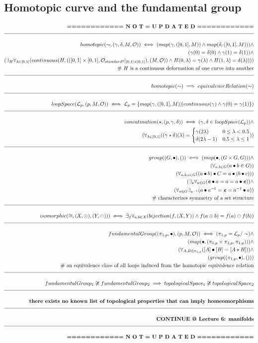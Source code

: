 \documentclass[a4paper]{article}
\newcommand{\melazy}{\textbf{============ N O T = U P D A T E D ============}}
\newcommand{\eqComment}[1]{\text{  \# #1}}
\newcommand{\n}{\\[1.5ex] \hline \nonumber \\[0ex]}
\newcommand{\m}{\nonumber \\}
\newcommand{\field}[1]{\textbf{\textit{#1}}}
\begin{document}
\subsection{Homotopic curve and the fundamental group}
\begin{tcolorbox}
\begin{align}
   \melazy
\n homotopic(\sim, (\gamma, \delta, M, \mathcal{O})) \iff (map(\gamma, ([0, 1], M)) \land map(\delta, ([0, 1], M))) \land 
\m (\gamma(0) = \delta(0) \land \gamma(1) = \delta(1)) \land
\m (\exists_H \forall_{\lambda \in [0, 1]} (continuous(H, (([0, 1] \times [0, 1], \mathcal{O}_{standard^2}|_{[0, 1] \times [0, 1]}), (M, \mathcal{O})) \land H(0, \lambda) = \gamma(\lambda) \land H(1, \lambda) = \delta(\lambda))))
\m \eqComment{$H$ is a continuous deformation of one curve into another}
\n homotopic(\sim) \implies equivalenceRelation(\sim)
\n loopSpace(\mathcal{L}_p, (p, M, \mathcal{O})) \iff \mathcal{L}_p = \{map(\gamma, ([0, 1], M))| continuous(\gamma) \land \gamma(0) = \gamma(1)\})
\n concatination(\star, (p, \gamma, \delta)) \iff (\gamma, \delta \in loopSpace(\mathcal{L}_p)) \land
\m (\forall_{\lambda \in [0, 1]} ((\gamma \star \delta) (\lambda) = \begin{cases} \gamma(2 \lambda) & 0 \leq \lambda < 0.5 \\ \delta(2 \lambda - 1) & 0.5 \leq \lambda \leq 1 \end{cases}))
\n group((G, \bullet), ()) \iff (map(\bullet, (G \times G, G))) \land
\m (\forall_{a, b \in G} (a \bullet b \in G))
\m (\forall_{a, b, c \in G} ((a \bullet b) \bullet C = a \bullet (b \bullet c)))
\m (\exists_\field{e} \forall_{a \in G} (\field{e} \bullet a = a = a \bullet \field{e})) \land
\m (\forall_{a \in G} \exists_{a^{-1}} (a \bullet a^{-1} = \field{e} = a^{-1} \bullet a))
\m \eqComment{characterizes symmetry of a set structure}
\n isomorphic(\cong, (X, \odot), (Y, \ominus))) \iff \exists_f \forall_{a, b \in X} (bijection(f, (X, Y)) \land f(a \odot b) = f(a) \ominus f(b))
\n fundamentalGroup((\pi_{1, p}, \bullet), (p, M, \mathcal{O})) \iff (\pi_{1, p} = \mathcal{L}_p / \sim) \land
\m (map(\bullet, (\pi_{1, p} \times \pi_{1, p}, \pi_{1, p}))) \land
\m (\forall_{A, B \in \pi_{1, p}} ([A] \bullet [B] = [A \star B])) \land
\m (group((\pi_{1, p}, \bullet), ()))
\m \eqComment{an equivalence class of all loops induced from the homotopic equivalence relation}
\n fundamentalGroup_1 \centernot\cong fundamentalGroup_2 \implies topologicalSpace_1 \centernot\cong topologicalSpace_2
\n \textbf{there exists no known list of topological properties that can imply homeomorphisms}
\n \textbf{CONTINUE @ Lecture 6: manifolds}
\n \melazy
\end{align}
\end{tcolorbox}
\end{document}
